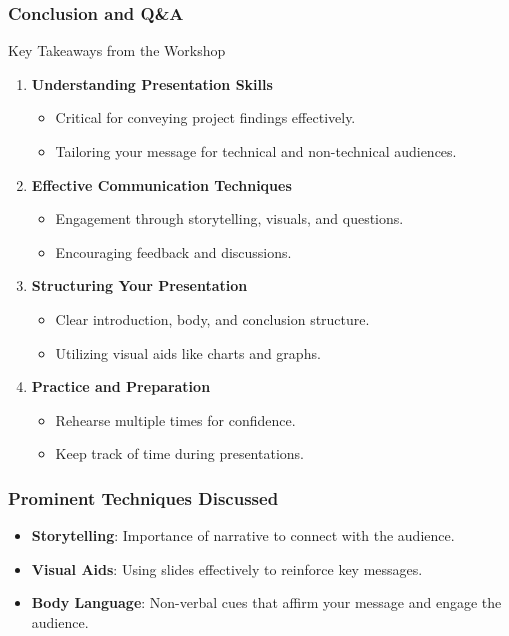 \documentclass[aspectratio=169]{beamer}
\begin{document}
\begin{frame}[fragile]
    \frametitle{Conclusion and Q\&A}
    \begin{block}{Key Takeaways from the Workshop}
        \begin{enumerate}
            \item \textbf{Understanding Presentation Skills}
                \begin{itemize}
                    \item Critical for conveying project findings effectively.
                    \item Tailoring your message for technical and non-technical audiences.
                \end{itemize}
            \item \textbf{Effective Communication Techniques}
                \begin{itemize}
                    \item Engagement through storytelling, visuals, and questions.
                    \item Encouraging feedback and discussions.
                \end{itemize}
            \item \textbf{Structuring Your Presentation}
                \begin{itemize}
                    \item Clear introduction, body, and conclusion structure.
                    \item Utilizing visual aids like charts and graphs.
                \end{itemize}
            \item \textbf{Practice and Preparation}
                \begin{itemize}
                    \item Rehearse multiple times for confidence.
                    \item Keep track of time during presentations.
                \end{itemize}
        \end{enumerate}
    \end{block}
\end{frame}

\begin{frame}[fragile]
    \frametitle{Prominent Techniques Discussed}
    \begin{itemize}
        \item \textbf{Storytelling}: Importance of narrative to connect with the audience.
        \item \textbf{Visual Aids}: Using slides effectively to reinforce key messages.
        \item \textbf{Body Language}: Non-verbal cues that affirm your message and engage the audience.
    \end{itemize}
\end{frame}
\end{document}
